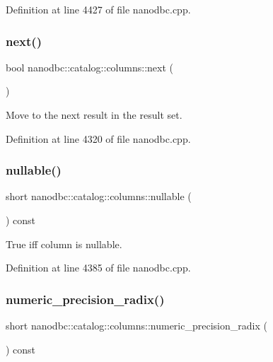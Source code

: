 Definition at line 4427 of file nanodbc.\+cpp.

\mbox{\label{classnanodbc_1_1catalog_1_1columns_a81a4fc993319b106131a8f2c23874042}} 
\subsubsection{\texorpdfstring{next()}{next()}}
{\footnotesize\ttfamily bool nanodbc\+::catalog\+::columns\+::next (\begin{DoxyParamCaption}{ }\end{DoxyParamCaption})}



Move to the next result in the result set. 



Definition at line 4320 of file nanodbc.\+cpp.

\mbox{\label{classnanodbc_1_1catalog_1_1columns_a89adcbcb8698c4365066a14438bd7dba}} 
\subsubsection{\texorpdfstring{nullable()}{nullable()}}
{\footnotesize\ttfamily short nanodbc\+::catalog\+::columns\+::nullable (\begin{DoxyParamCaption}{ }\end{DoxyParamCaption}) const}



True iff column is nullable. 



Definition at line 4385 of file nanodbc.\+cpp.

\mbox{\label{classnanodbc_1_1catalog_1_1columns_a3025408df3ed506759739ee6a415e70a}} 
\subsubsection{\texorpdfstring{numeric\_precision\_radix()}{numeric\_precision\_radix()}}
{\footnotesize\ttfamily short nanodbc\+::catalog\+::columns\+::numeric\+\_\+precision\+\_\+radix (\begin{DoxyParamCaption}{ }\end{DoxyParamCaption}) const}



